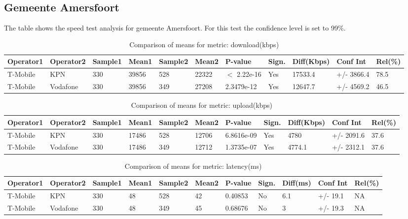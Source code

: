 \documentclass[]{article}
\begin{document}
\normalsize

\newpage

\subsection{Gemeente Amersfoort}\label{gemeente-amersfoort}

The table shows the speed test analysis for gemeente Amersfoort. For
this test the confidence level is set to 99\%.

\begin{table}[ht]
\centering
{\footnotesize
\begin{tabular}{lllllllllll}
  \hline
Operator1 & Operator2 & Sample1 & Mean1 & Sample2 & Mean2 & P-value & Sign. & Diff(Kbps) & Conf Int & Rel(\%) \\ 
  \hline
T-Mobile & KPN & 330 & 39856 & 528 & 22322 & $<$ 2.22e-16 & Yes & 17533.4 & +/- 3866.4 & 78.5 \\ 
  T-Mobile & Vodafone & 330 & 39856 & 349 & 27208 & 2.3479e-12 & Yes & 12647.7 & +/- 4569.2 & 46.5 \\ 
   \hline
\end{tabular}
}
\caption{Comparison of means for metric: download(kbps)} 
\end{table}\begin{table}[ht]
\centering
{\footnotesize
\begin{tabular}{lllllllllll}
  \hline
Operator1 & Operator2 & Sample1 & Mean1 & Sample2 & Mean2 & P-value & Sign. & Diff(Kbps) & Conf Int & Rel(\%) \\ 
  \hline
T-Mobile & KPN & 330 & 17486 & 528 & 12706 & 6.8616e-09 & Yes & 4780 & +/- 2091.6 & 37.6 \\ 
  T-Mobile & Vodafone & 330 & 17486 & 349 & 12712 & 1.3735e-07 & Yes & 4774.1 & +/- 2312.1 & 37.6 \\ 
   \hline
\end{tabular}
}
\caption{Comparison of means for metric: upload(kbps)} 
\end{table}\begin{table}[ht]
\centering
{\footnotesize
\begin{tabular}{lllllllllll}
  \hline
Operator1 & Operator2 & Sample1 & Mean1 & Sample2 & Mean2 & P-value & Sign. & Diff(ms) & Conf Int & Rel(\%) \\ 
  \hline
T-Mobile & KPN & 330 & 48 & 528 & 42 & 0.40853 & No & 6.1 & +/- 19.1 & NA \\ 
  T-Mobile & Vodafone & 330 & 48 & 349 & 45 & 0.68676 & No & 3 & +/- 19.3 & NA \\ 
   \hline
\end{tabular}
}
\caption{Comparison of means for metric: latency(ms)} 
\end{table}
\end{document}
